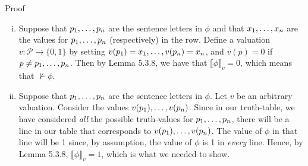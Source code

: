 \documentclass[../slides.tex]{subfiles}
\begin{document}
\begin{frame}{Proof}

\begin{enumerate}[(i)]
		
			\item Suppose that $p_1, \mathellipsis, p_n$ are the sentence letters in $\phi$ and that $x_1, \mathellipsis, x_n$ are the values for $p_1, \mathellipsis, p_n$ (respectively) in the row. Define a valuation $v:\mathcal{P}\to\{0,1\}$ by setting $v(p_1)=x_1, \mathellipsis, v(p_n)=x_n$, and $v(p)=0$ if $p\neq p_1, \mathellipsis, p_n$. Then by Lemma 5.3.8, we have that $\llbracket \phi\rrbracket_v=0$, which means that $\nvDash\phi$.
			
			\item Suppose that $p_1, \mathellipsis, p_n$ are the sentence letters in $\phi$. Let $v$ be an arbitrary valuation. Consider the values $v(p_1), \mathellipsis, v(p_n)$. Since in our truth-table, we have considered \emph{all} the possible truth-values for $p_1, \mathellipsis, p_n$, there will be a line in our table that corresponds to $v(p_1), \mathellipsis, v(p_n)$. The value of $\phi$ in that line will be 1 since, by assumption, the value of $\phi$ is 1 in \emph{every} line. Hence, by  Lemma 5.3.8, $\llbracket \phi\rrbracket_v=1$, which is what we needed to show.


		\end{enumerate}


\end{frame}
\end{document}
